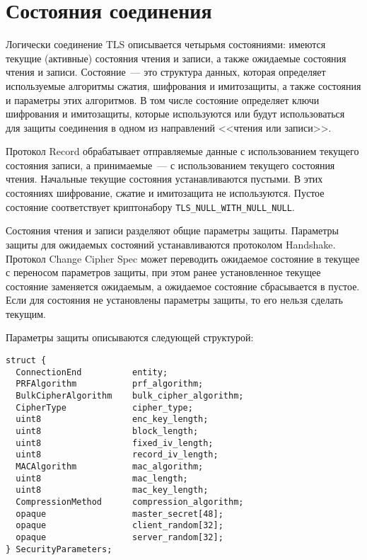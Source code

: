 \section {Состояния соединения}\label{RECORD.2}

Логически соединение TLS описывается четырьмя состояниями: имеются текущие 
(активные) состояния чтения и записи, а также ожидаемые состояния чтения и 
записи. Состояние~--- это структура данных, которая определяет используемые 
алгоритмы сжатия, шифрования и имитозащиты, а также состояния и параметры 
этих алгоритмов. В том числе состояние определяет ключи шифрования и 
имитозащиты, которые используются или будут использоваться для защиты 
соединения в одном из направлений <<чтения или записи>>.  

Протокол Record обрабатывает отправляемые данные с использованием текущего 
состояния записи, а принимаемые~--- с использованием текущего состояния 
чтения. Начальные текущие состояния устанавливаются пустыми. В этих 
состояниях шифрование, сжатие и имитозащита не используются. Пустое 
состояние соответствует криптонабору \lstinline{TLS_NULL_WITH_NULL_NULL}. 

Состояния чтения и записи разделяют общие параметры защиты. Параметры 
защиты для ожидаемых состояний устанавливаются протоколом Handshake. 
Протокол Change Cipher Spec может переводить ожидаемое состояние в 
текущее с переносом параметров защиты, при этом ранее установленное 
текущее состояние заменяется ожидаемым, а ожидаемое состояние сбрасывается 
в пустое. Если для состояния не установлены параметры защиты, то его 
нельзя сделать текущим. 

Параметры защиты описываются следующей структурой:
\begin{lstlisting}
struct {
  ConnectionEnd          entity;
  PRFAlgorithm           prf_algorithm;
  BulkCipherAlgorithm    bulk_cipher_algorithm;
  CipherType             cipher_type;
  uint8                  enc_key_length;
  uint8                  block_length;
  uint8                  fixed_iv_length;
  uint8                  record_iv_length;
  MACAlgorithm           mac_algorithm;
  uint8                  mac_length;
  uint8                  mac_key_length;
  CompressionMethod      compression_algorithm;
  opaque                 master_secret[48];
  opaque                 client_random[32];
  opaque                 server_random[32];
} SecurityParameters;
\end{lstlisting}

